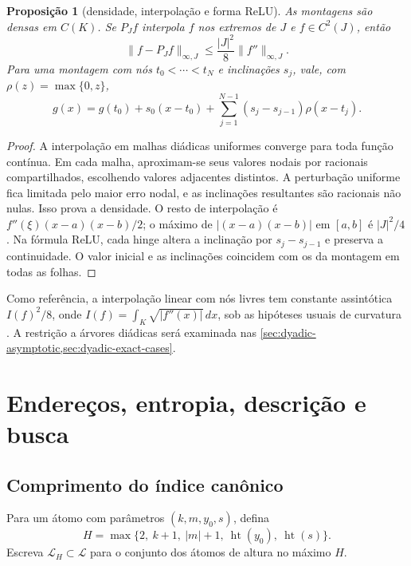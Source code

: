 \documentclass[11pt,a4paper]{article}
\newtheorem{proposition}[theorem]{Proposição}
\theoremstyle{definition}
\theoremstyle{remark}
\newcommand{\Library}{\mathcal{L}}
\newcommand{\height}{\operatorname{ht}}
\begin{document}
\begin{proposition}[densidade, interpolação e forma ReLU]\label{prop:preliminary-facts}
As montagens são densas em $C(K)$. Se $P_Jf$ interpola $f$ nos extremos de $J$ e $f\in C^2(J)$, então
\begin{equation}
 \|f-P_Jf\|_{\infty,J}\le\frac{|J|^2}{8}\|f''\|_{\infty,J}.
 \label{eq:interpolation-remainder}
\end{equation}
Para uma montagem com nós $t_0<\cdots<t_N$ e inclinações $s_j$, vale, com $\rho(z)=\max\{0,z\}$,
\begin{equation}
 g(x)=g(t_0)+s_0(x-t_0)+\sum_{j=1}^{N-1}(s_j-s_{j-1})\rho(x-t_j).
 \label{eq:assembly-relu}
\end{equation}
\end{proposition}
\begin{proof}
A interpolação em malhas diádicas uniformes converge para toda função contínua. Em cada malha, aproximam-se seus valores nodais por racionais compartilhados, escolhendo valores adjacentes distintos. A perturbação uniforme fica limitada pelo maior erro nodal, e as inclinações resultantes são racionais não nulas. Isso prova a densidade. O resto de interpolação é $f''(\xi)(x-a)(x-b)/2$; o máximo de $|(x-a)(x-b)|$ em $[a,b]$ é $|J|^2/4$. Na fórmula ReLU, cada hinge altera a inclinação por $s_j-s_{j-1}$ e preserva a continuidade. O valor inicial e as inclinações coincidem com os da montagem em todas as folhas.
\end{proof}

Como referência, a interpolação linear com nós livres tem constante assintótica $I(f)^2/8$, onde $I(f)=\int_K\sqrt{|f''(x)|}\,dx$, sob as hipóteses usuais de curvatura \citep{deboor1973variable,burchard1974}. A restrição a árvores diádicas será examinada nas \cref{sec:dyadic-asymptotic,sec:dyadic-exact-cases}.

\section{Endereços, entropia, descrição e busca}
\label{sec:complexity}

\subsection{Comprimento do índice canônico}

Para um átomo com parâmetros $(k,m,y_0,s)$, defina
\begin{equation}
 H=\max\{2,\ k+1,\ |m|+1,\ \height(y_0),\ \height(s)\}.
 \label{eq:atom-height}
\end{equation}
Escreva $\Library_H\subset\Library$ para o conjunto dos átomos de altura no máximo $H$.
\end{document}
